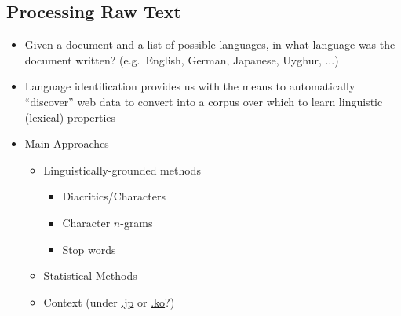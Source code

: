 \documentclass[a4paper,landscape,headrule,footrule,dvips]{foils}
\begin{document}
\begin{CJK}{UTF8}{min}


\section{Processing Raw Text}


\begin{itemize}

\item Given a document and a list of possible languages, in
  what language was the document written? (e.g.\ English, German, Japanese, Uyghur, ...)
\item Language identification provides us with the means to
  automatically ``discover'' web data to convert into a corpus over
  which to learn linguistic (lexical) properties
\item Main Approaches
\begin{itemize}
\item Linguistically-grounded methods
  \begin{itemize}
  \item Diacritics/Characters
  \item Character $n$-grams
  \item Stop words
  \end{itemize}
\item Statistical Methods
\item Context (under \url{.jp} or \url{.ko}?)
\end{itemize}


\end{itemize}



\end{CJK}
\end{document}
